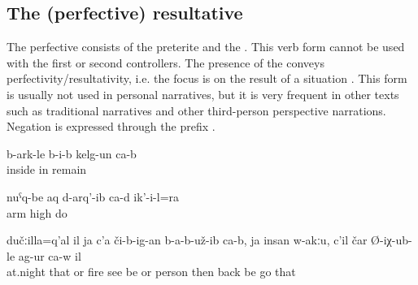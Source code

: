 
\subsection{The (perfective) resultative}
\label{ssec:The (perfective) resultative}

The perfective  consists of the preterite and the . This verb form cannot be used with the first or second  controllers. The presence of the  conveys perfectivity/resultativity, i.e. the focus is on the result of a situation . This form is usually not used in personal narratives, but it is very frequent in other texts such as traditional narratives and other third-person perspective narrations. Negation is expressed through the prefix  .
%
\begin{exe}
	\ex	\label{ex:(The color) has remained inside}
	\gll	b-ark-le	b-i-b	kelg-un	ca-b\\
		inside	in	remain	\\
	\glt	{}

	\ex	\label{ex:He has also taken up his hands}
	\gll	nuˁq-be	aq	d-arq'-ib	ca-d	ik'-i-l=ra\\
		arm	high	do		\\
	\glt	{}
	
	\ex	\label{ex:‎‎‎It was at night, there was no fire visible, nobody is there, then he turned and came back}
	\gll	dučːilla=q'al	il	ja	c'a	či-b-ig-an	b-a-b-už-ib	ca-b,		ja	insan	w-akːu,		c'il	čar	Ø-iχ-ub-le	ag-ur	ca-w	il\\
		at.night	that	or	fire	see	be			or	person	\tsc{m-}	then	back	be	go		that\\
	\glt	{}
\end{exe}

